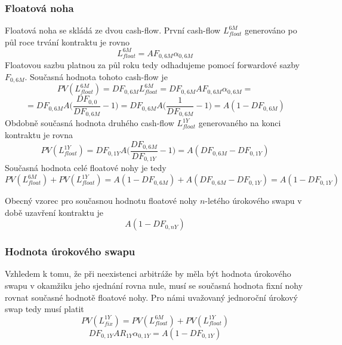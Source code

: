 \documentclass[a4paper]{book}
\begin{document}
\subsubsection{Floatová noha}

Floatová noha se skládá ze dvou cash-flow. První cash-flow $L_{float}^{6M}$ generováno po půl roce trvání kontraktu je rovno
\begin{equation*}
L_{float}^{6M} = A F_{0,6M} \alpha_{0,6M}
\end{equation*}
Floatovou sazbu platnou za půl roku tedy odhadujeme pomocí forwardové sazby $F_{0,6M}$. Současná hodnota tohoto cash-flow je
\begin{equation*}
PV(L_{float}^{6M}) = DF_{0,6M} L_{float}^{6M} = DF_{0,6M} A F_{0,6M} \alpha_{0,6M} =
\end{equation*}
\begin{equation*}
= DF_{0,6M} A \bigg( \frac{DF_{0,0}}{DF_{0,6M}} - 1 \bigg) = DF_{0,6M} A \bigg( \frac{1}{DF_{0,6M}} - 1 \bigg) = A (1 - DF_{0,6M})
\end{equation*}
Obdobně současná hodnota druhého cash-flow $L_{float}^{1Y}$ generovaného na konci kontraktu je rovna
\begin{equation*}
PV(L_{float}^{1Y}) = DF_{0,1Y} A \bigg( \frac{DF_{0,6M}}{DF_{0,1Y}} - 1 \bigg) = A (DF_{0,6M} - DF_{0,1Y})
\end{equation*}
Současná hodnota celé floatové nohy je tedy
\begin{equation*}
PV(L_{float}^{6M}) + PV(L_{float}^{1Y}) = A (1 - DF_{0,6M}) + A (DF_{0,6M} - DF_{0,1Y}) = A (1 - DF_{0,1Y})
\end{equation*}

Obecný vzorec pro současnou hodnotu floatové nohy $n$-letého úrokového swapu v době uzavření kontraktu je
\begin{equation}
A(1 - DF_{0,nY})
\end{equation}

\subsubsection{Hodnota úrokového swapu}

Vzhledem k tomu, že při neexistenci arbitráže by měla být hodnota úrokového swapu v okamžiku jeho sjednání rovna nule, musí se současná hodnota fixní nohy rovnat současné hodnotě floatové nohy. Pro námi uvažovaný jednoroční úrokový swap tedy musí platit
\begin{equation*}
PV(L_{fix}^{1Y}) = PV(L_{float}^{6M}) + PV(L_{float}^{1Y}) 
\end{equation*}
\begin{equation}
DF_{0, 1Y} A R_{1Y} \alpha_{0,1Y} = A (1 - DF_{0,1Y})
\end{equation}
\end{document}
